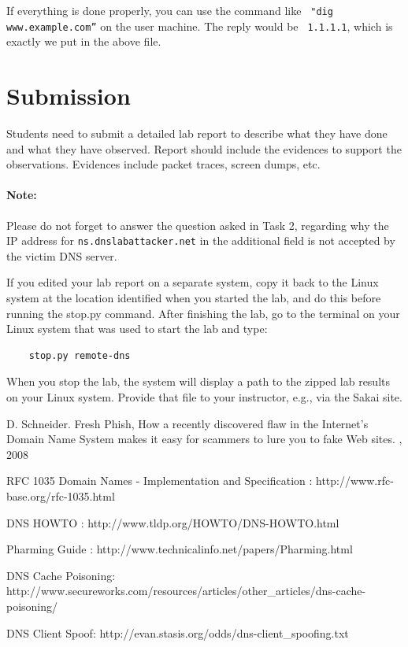 If everything is done properly, you can use the command like {\tt
"dig www.example.com”} on the user machine. The reply would be {\tt
1.1.1.1}, which is exactly we put in the above file. 



\section{Submission}

Students need to submit a detailed lab report to describe what they have done and
what they have observed. Report should include the evidences to support 
the observations. Evidences include packet traces, screen dumps, etc.

\paragraph{Note:} Please do not forget to answer the question asked in
Task 2, regarding why the IP address for 
{\tt ns.dnslabattacker.net} in the additional field is not
accepted by the victim DNS server. 

If you edited your lab report on a separate system, copy it back to the Linux system at the location
identified when you started the lab, and do this before running the stop.py command.
After finishing the lab, go to the terminal on your Linux system that was used to start the lab and type:
\begin{verbatim}
    stop.py remote-dns
\end{verbatim}
When you stop the lab, the system will display a path to the zipped lab results on your Linux system.  Provide that file to
your instructor, e.g., via the Sakai site.


\begin{thebibliography}{10}

\newblock D. Schneider.
\newblock Fresh Phish, How a recently discovered flaw in the Internet's Domain Name
System makes it easy for scammers to lure you to fake Web sites.
, 2008  

RFC 1035 Domain Names - Implementation and Specification :
\newblock http://www.rfc-base.org/rfc-1035.html

DNS HOWTO :
\newblock http://www.tldp.org/HOWTO/DNS-HOWTO.html

Pharming Guide :
\newblock http://www.technicalinfo.net/papers/Pharming.html

DNS Cache Poisoning:
\newblock http://www.secureworks.com/resources/articles/other\_articles/dns-cache-poisoning/

DNS Client Spoof:
\newblock http://evan.stasis.org/odds/dns-client\_spoofing.txt


\end{thebibliography}


